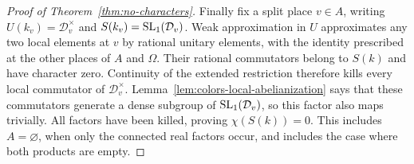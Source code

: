 \begin{proof}[Proof of Theorem~\ref{thm:no-characters}]
Finally fix a split place $v\in A$, writing
$U(k_v)=\mathcal D_v^\times$ and $S(k_v)=\operatorname{SL}_1(\mathcal D_v)$.
Weak approximation in $U$ approximates any two local elements at $v$
by rational unitary elements, with the identity prescribed at the
other places of $A$ and $\Omega$. Their rational commutators belong to
$S(k)$ and have character zero. Continuity of the extended restriction
therefore kills every local commutator of $\mathcal D_v^\times$.
Lemma~\ref{lem:colors-local-abelianization} says that these commutators
generate a dense subgroup of $\operatorname{SL}_1(\mathcal D_v)$, so this factor also
maps trivially. All factors have been killed, proving
$\chi(S(k))=0$. This includes $A=\varnothing$, when only the connected
real factors occur, and includes the case where both products are
empty.
\end{proof}
